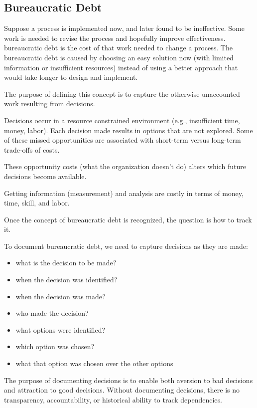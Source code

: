 \subsection{Bureaucratic Debt\label{sec:bureaucratic_debt}}


Suppose a process is implemented now, and later found to be ineffective. Some work is needed to revise the process and hopefully improve effectiveness. \gls{bureaucratic debt} is the cost of that work needed to change a process. The bureaucratic debt is caused by choosing an easy solution now (with limited information or insufficient resources) instead of using a better approach that would take longer to design and implement.

The purpose of defining this concept is to capture the otherwise unaccounted work resulting from decisions.


Decisions occur in a resource constrained environment (e.g., insufficient time, money, labor). Each decision made results in options that are not explored. Some of these missed opportunities are associated with short-term versus long-term trade-offs of costs.

These opportunity costs (what the organization doesn't do) alters which future decisions become available.

Getting information (measurement) and analysis are costly in terms of money, time, skill, and labor.

Once the concept of bureaucratic debt is recognized, the question is how to track it.

To document bureaucratic debt, we need to capture decisions as they are made:
\begin{itemize}
    \item what is the decision to be made?
    \item when the decision was identified?
    \item when the decision was made?
    \item who made the decision?
    \item what options were identified?
    \item which option was chosen?
    \item what that option was chosen over the other options
\end{itemize}
The purpose of documenting decisions is to enable both aversion to bad decisions and attraction to good decisions. Without documenting decisions, there is no transparency, accountability, or historical ability to track dependencies. 

